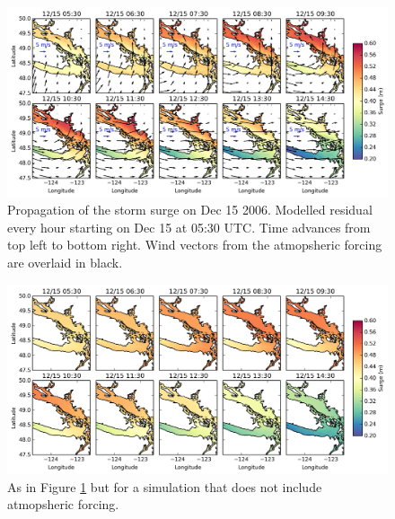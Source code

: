 \documentclass[pdftex,10pt]{article}
\begin{document}
\begin{figure}
\centering
\includegraphics[scale=0.6]{Figures/dec2006_spatial.pdf}
\caption{Propagation of the storm surge on Dec 15 2006. Modelled residual every hour starting on Dec 15 at 05:30 UTC. Time advances from top left to bottom right. Wind vectors from the atmopsheric forcing are overlaid in black.}
\label{fig:spatial}
\end{figure}

\begin{figure}
\centering
\includegraphics[scale=0.6]{Figures/dec2006_spatial_sshonly.pdf}
\caption{As in Figure \ref{fig:spatial} but for a simulation that does not include atmopsheric forcing. }
\label{fig:spatial_sshonly}
\end{figure}
\end{document}
